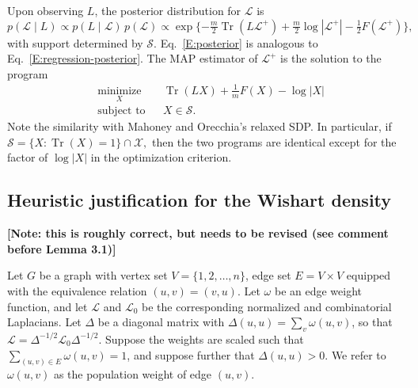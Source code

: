 \documentclass[12pt]{article}
\DeclareMathOperator*{\Tr}{Tr}
\theoremstyle{plain}
\begin{document}
Upon observing $L$, the posterior distribution for $\mathcal{L}$ is
\begin{equation}\label{E:posterior}
  p(\mathcal{L} \mid L)
    \propto p(L \mid \mathcal{L}) \, p (\mathcal{L})
    \propto \exp\{ -\tfrac{m}{2} \Tr(L \mathcal{L}^+)
                   + \tfrac{m}{2} \log |\mathcal{L}^+|
                   - \tfrac{1}{2} F(\mathcal{L^+}) \},
\end{equation}
with support determined by $\mathcal{S}$.  Eq.~\eqref{E:posterior} is
analogous to Eq.~\eqref{E:regression-posterior}.  The MAP estimator of
$\mathcal{L}^+$ is the solution to the program
\[
\begin{aligned}
  & \underset{X}{\text{minimize}}
  & & \Tr(L X) + \tfrac{1}{m} F(X) - \log |X| \\
  & \text{subject to}
  & & X \in \mathcal{S}.
\end{aligned}
\]
Note the similarity with Mahoney and Orecchia's relaxed SDP.
In particular, if
\(
  \mathcal{S} = \{ X : \Tr(X) = 1 \} \cap \mathcal{X},
\)
then the two programs are identical except for the factor of
$\log |X|$ in the optimization criterion.



\subsection{Heuristic justification for the Wishart density}

\textbf{[Note: this is roughly correct, but needs to be revised (see
  comment before Lemma 3.1)]}

Let $G$ be a graph with vertex set $V = \{ 1, 2, \dotsc, n \}$, edge
set $E = V \times V$ equipped with the equivalence relation
$(u,v) = (v,u)$.  Let $\omega$ be an edge weight function, and let
$\mathcal{L}$ and $\mathcal{L}_0$ be the corresponding normalized and
combinatorial Laplacians.  Let $\Delta$ be a diagonal matrix with
$\Delta(u,u) = \sum_{v} \omega(u,v)$, so that
$\mathcal{L} = \Delta^{-1/2} \mathcal{L}_0 \Delta^{-1/2}$.  Suppose
the weights are scaled such that $\sum_{(u,v) \in E} \omega(u,v) = 1$,
and suppose further that $\Delta(u,u) > 0$.
We refer to $\omega(u,v)$ as the population weight of edge $(u,v)$.
\end{document}
